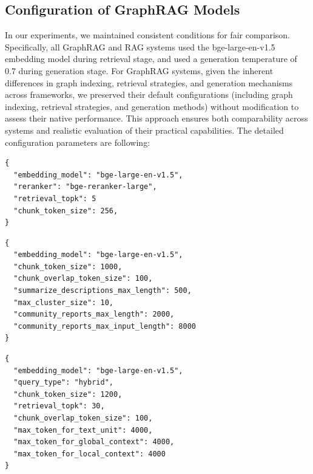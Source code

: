 \documentclass{article} %
\begin{document}
\subsection{Configuration of GraphRAG Models}\label{sec:appendix_config}

In our experiments, we maintained consistent conditions for fair comparison. Specifically, all GraphRAG and RAG systems used the bge-large-en-v1.5 embedding model during retrieval stage, and used a generation temperature of 0.7 during generation stage. For GraphRAG systems, given the inherent differences in graph indexing, retrieval strategies, and generation mechanisms across frameworks, we preserved their default configurations (including graph indexing, retrieval strategies, and generation methods) without modification to assess their native performance. This approach ensures both comparability across systems and realistic evaluation of their practical capabilities. The detailed configuration parameters are following: 


\noindent

\begin{tcolorbox}[
    colframe=black,        
    colback=gray!15,      
    coltitle=white,        
    fonttitle=\bfseries,   
    title=RAG Configuration
]
\begin{verbatim}
{
  "embedding_model": "bge-large-en-v1.5",
  "reranker": "bge-reranker-large",
  "retrieval_topk": 5
  "chunk_token_size": 256,
}
\end{verbatim}
\end{tcolorbox}
\begin{tcolorbox}[
    colframe=black,       
    colback=gray!15,      
    coltitle=white,       
    fonttitle=\bfseries,
    title=MS-GraphRAG(global\&local) Configuration
]
\begin{verbatim}
{
  "embedding_model": "bge-large-en-v1.5",
  "chunk_token_size": 1000,
  "chunk_overlap_token_size": 100,
  "summarize_descriptions_max_length": 500,
  "max_cluster_size": 10,   
  "community_reports_max_length": 2000,
  "community_reports_max_input_length": 8000
}
\end{verbatim}
\end{tcolorbox}
\begin{tcolorbox}[
    colframe=black,       
    colback=gray!15,      
    coltitle=white,    
    fonttitle=\bfseries,   
    title=LightRAG Configuration
]
\begin{verbatim}
{
  "embedding_model": "bge-large-en-v1.5",
  "query_type": "hybrid",
  "chunk_token_size": 1200,
  "retrieval_topk": 30,
  "chunk_overlap_token_size": 100,
  "max_token_for_text_unit": 4000,
  "max_token_for_global_context": 4000,
  "max_token_for_local_context": 4000
}
\end{verbatim}
\end{tcolorbox}
\end{document}
